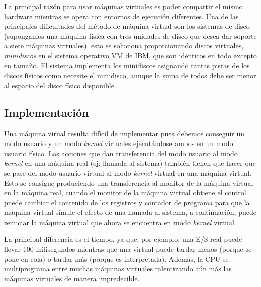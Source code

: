 \documentclass[10pt,a4paper,spanish]{report}
\begin{document}
  \noindent
  La principal razón para usar máquinas virtuales es poder compartir el mismo hardware mientras se opera con entornos de ejecución diferentes. Una de las principales dificultades del método de máquina virtual son los sistemas de disco (supongamos una máquina física con tres unidades de disco que desea dar soporte a siete máquinas virtuales), esto se soluciona proporcionando discos virtuales, \textit{minidiscos} en el sistema operativo VM de IBM, que son idénticos en todo excepto en tamaño. El sistema implementa los minidiscos asignando tantas pistas de los discos físicos como necesite el minidisco, aunque la suma de todos debe ser menor al espacio del disco físico disponible.

  \subsection{Implementación}
  \noindent
  Una máquina virual resulta difícil de implementar pues debemos conseguir un modo usuario y un modo \textit{kernel} virtuales ejecutándose ambos en un modo usuario físico. Las acciones que dan transferencia  del modo usuario al modo \textit{kernel} en una máquina real (ej: llamada al sistema) también tienen que hacer que se pase del modo usuario virtual al modo \textit{kernel} virtual en una máquina virtual. Esto se consigue produciendo una transferencia al monitor de la máquina virtual en la máquina real, cuando el monitor de la máquina virtual obtiene el control puede cambiar el contenido de los registros y contador de programa para que la máquina virtual simule el efecto de una llamada al sistema, a continuación, puede reiniciar la máquina virtual que ahora se encuentra en modo \textit{kernel} virtual.

  \noindent
  La principal diferencia es el tiempo, ya que, por ejemplo, una E/S real puede llevar 100 milisegundos mientras que una virtual puede tardar menos (porque se pone en cola) o tardar más (porque es interpretada). Además, la CPU se multiprograma entre muchas máquinas virtuales ralentizando aún más las máquinas virtuales de manera impredecible.
\end{document}
